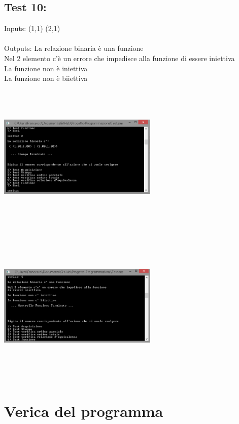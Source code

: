 \documentclass[11pt, a4paper, titlepage, block]{article}
\begin{document}
	\subsection{Test 10:}
	Inputs: (1,1) (2,1) \\
	\\
	Outputs: La relazione binaria \`e una funzione\\
	Nel 2 elemento c'\`e un errore che impedisce alla funzione di essere iniettiva\\
	La funzione non \`e iniettiva\\
	La funzione non \`e biiettiva\\
	\includegraphics[width=3in,height=3in,viewport=0 0 300 300]{../Screenshots/Test10Input.png}
	\\
	\includegraphics[width=3in,height=3in,viewport=0 0 300 300]{../Screenshots/Test10Output.PNG}
	\newpage
	\section{Verica del programma}
\end{document}
